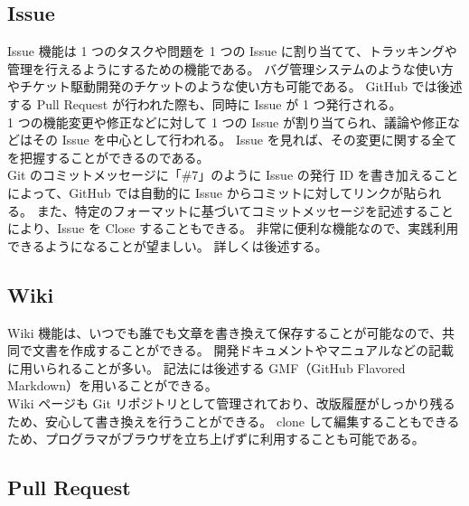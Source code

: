 \subsection{Issue}
Issue 機能は 1 つのタスクや問題を 1 つの Issue に割り当てて、トラッキングや管理を行えるようにするための機能である。
バグ管理システムのような使い方やチケット駆動開発のチケットのような使い方も可能である。
GitHub では後述する Pull Request が行われた際も、同時に Issue が 1 つ発行される。\\

1 つの機能変更や修正などに対して 1 つの Issue が割り当てられ、議論や修正などはその Issue を中心として行われる。
Issue を見れば、その変更に関する全てを把握することができるのである。\\

Git のコミットメッセージに「\#{}7」のように Issue の発行 ID を書き加えることによって、GitHub では自動的に Issue からコミットに対してリンクが貼られる。
また、特定のフォーマットに基づいてコミットメッセージを記述することにより、Issue を Close することもできる。
非常に便利な機能なので、実践利用できるようになることが望ましい。
詳しくは後述する。
\subsection{Wiki}
Wiki 機能は、いつでも誰でも文章を書き換えて保存することが可能なので、共同で文書を作成することができる。
開発ドキュメントやマニュアルなどの記載に用いられることが多い。
記法には後述する GMF（GitHub Flavored Markdown）を用いることができる。\\

Wiki ページも Git リポジトリとして管理されており、改版履歴がしっかり残るため、安心して書き換えを行うことができる。
clone して編集することもできるため、プログラマがブラウザを立ち上げずに利用することも可能である。
\subsection{Pull Request}
